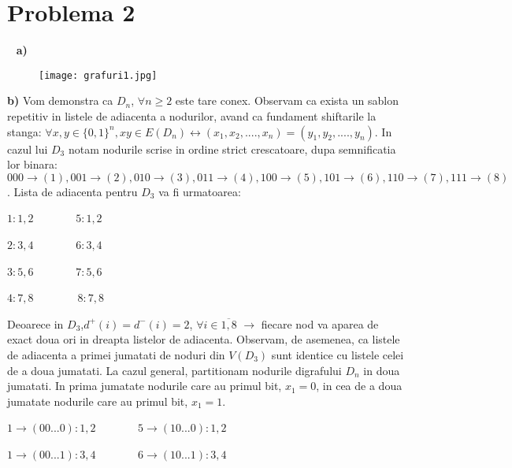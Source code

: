 \documentclass{article}
\begin{document}
\section{Problema 2} 
\
\newline
\textbf{a)}
\begin{figure}[h]
\centering
\texttt{[image: grafuri1.jpg]}
\end{figure}
\newline
\textbf{b)} Vom demonstra ca \textbf{$D_n$}, $\forall n \geq 2 $ este tare conex. Observam ca exista un sablon repetitiv in listele de adiacenta a nodurilor, avand ca fundament shiftarile la stanga: $\forall x,y \in \{0,1\}^n, xy \in E(D_n)  \leftrightarrow (x_1,x_2,...., x_n)=(y_1, y_2,...., y_n)$.
\newline
In cazul lui \textbf{$D_3$} notam nodurile scrise in ordine strict crescatoare, dupa semnificatia lor binara: $000 \rightarrow (1), 001 \rightarrow (2),010 \rightarrow (3),011 \rightarrow (4),100 \rightarrow (5),101 \rightarrow (6),110 \rightarrow (7),111 \rightarrow (8)$.
\newline
Lista de adiacenta pentru \textbf{$D_3$} va fi urmatoarea: 
\begin{center}
$1: 1,2$ \ \ \ \ \ \ \ $5: 1,2$
\end{center}
\begin{center}
$2: 3,4$ \ \ \ \ \ \ \ $6: 3,4$
\end{center}
\begin{center}
$3: 5,6$ \ \ \ \ \ \ \ $7: 5,6$
\end{center}
\begin{center}
$4: 7,8$\ \ \ \ \ \ \ \ $8: 7,8$
\end{center}
Deoarece in $\textbf{$D_3$}$,$d^+(i)=d^-(i)=2$,  $\forall i \in \overline{1,8}$ $\rightarrow$ fiecare nod va aparea de exact doua ori in dreapta listelor de adiacenta. Observam, de asemenea, ca listele de adiacenta a primei jumatati de noduri din $V(D_3)$ sunt identice cu listele celei de a doua jumatati. 
\newline
\newline
La cazul general, partitionam nodurile digrafului $D_n$ in doua jumatati. In prima jumatate nodurile care au primul bit, $x_1=0$, in cea de a doua jumatate nodurile care au primul bit, $x_1=1$.
\begin{center}
$1 \rightarrow (00...0): 1,2$ \ \ \ \ \ \ \ $5 \rightarrow (10...0) :  1,2$
\end{center}
\begin{center}
$1 \rightarrow (00...1): 3,4$ \ \ \ \ \ \ \ $6 \rightarrow (10...1) :  3,4$
\end{center}
\end{document}
